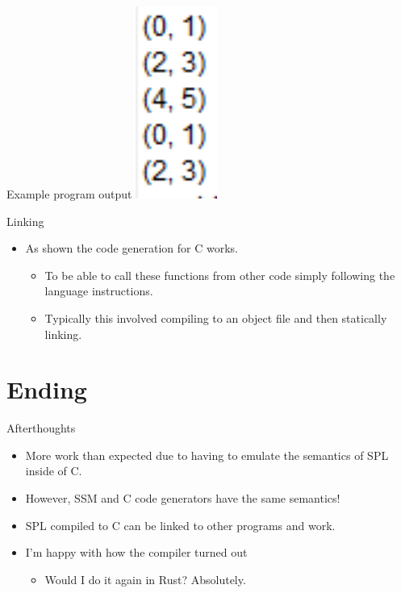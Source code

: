\documentclass[10pt]{beamer}
\begin{document}
\begin{frame}{Example program output}
\includegraphics[width=0.2\textwidth]{presentation4/9.png}
\end{frame}

\begin{frame}{Linking}
    \begin{itemize}
        \item As shown the code generation for C works.
        \begin{itemize}
            \item To be able to call these functions from other code simply following the language instructions.
            \item Typically this involved compiling to an object file and then statically linking.
        \end{itemize}
    \end{itemize}
\end{frame}

\section{Ending}
\begin{frame}{Afterthoughts}
    \begin{itemize}
        \item More work than expected due to having to emulate the semantics of SPL inside of C.
        \item However, SSM and C code generators have the same semantics!
        \item SPL compiled to C can be linked to other programs and work.
        \item I'm happy with how the compiler turned out
        \begin{itemize}
            \item Would I do it again in Rust? Absolutely.
        \end{itemize}
    \end{itemize}
\end{frame}
\end{document}
